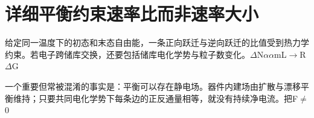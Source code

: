 \section{{\cjkfont 详细平衡约束速率比而非速率大小}\allowbreak{}}\label{sec:19}
{\cjkfont 给定同一温度下的初态和末态自由能，一条正向跃迁与逆向跃迁的比值受到热力学约束。若电子跨储库交换，还要包括储库电化学势与粒子数变化。}\allowbreak{}\ensuremath{\Delta}N\ensuremath{\alpha}\allowbreak{}\ensuremath{\alpha}\allowbreak{}m\allowbreak{}L\ensuremath{\to}R\allowbreak{}\ensuremath{\Delta}G\allowbreak{}
\par
{\cjkfont 一个重要但常被混淆的事实是：平衡可以存在静电场。器件内建场由扩散与漂移平衡维持；只要共同电化学势下每条边的正反通量相等，就没有持续净电流。把}\allowbreak{}F\ensuremath{\ne}\allowbreak{}0\allowbreak{}
\par
